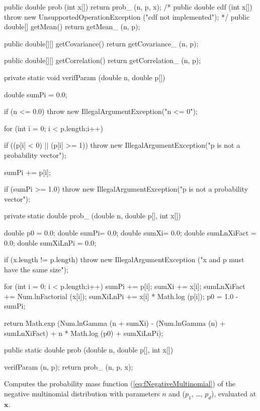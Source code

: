 \begin{code}\begin{hide}

   public double prob (int x[]) {
      return prob_ (n, p, x);
   }
/*
   public double cdf (int x[]) {
      throw new UnsupportedOperationException ("cdf not implemented");
   }
*/
   public double[] getMean() {
      return getMean_ (n, p);
   }

   public double[][] getCovariance() {
      return getCovariance_ (n, p);
   }

   public double[][] getCorrelation() {
      return getCorrelation_ (n, p);
   }

   private static void verifParam (double n, double p[]) {
      double sumPi = 0.0;

      if (n <= 0.0)
         throw new IllegalArgumentException("n <= 0");

      for (int i = 0; i < p.length;i++) {
         if ((p[i] < 0) || (p[i] >= 1))
            throw new IllegalArgumentException("p is not a probability vector");

         sumPi += p[i];
      }
      if (sumPi >= 1.0)
         throw new IllegalArgumentException("p is not a probability vector");
   }

   private static double prob_ (double n, double p[], int x[]) {
      double p0 = 0.0;
      double sumPi= 0.0;
      double sumXi= 0.0;
      double sumLnXiFact = 0.0;
      double sumXiLnPi = 0.0;

      if (x.length != p.length)
         throw new IllegalArgumentException ("x and p must have the same size");

      for (int i = 0; i < p.length;i++)
      {
         sumPi += p[i];
         sumXi += x[i];
         sumLnXiFact += Num.lnFactorial (x[i]);
         sumXiLnPi += x[i] * Math.log (p[i]);
      }
      p0 = 1.0 - sumPi;

      return Math.exp (Num.lnGamma (n + sumXi) - (Num.lnGamma (n) +
           sumLnXiFact) + n * Math.log (p0) + sumXiLnPi);
   }\end{hide}

   public static double prob (double n, double p[], int x[])\begin{hide} {
      verifParam (n, p);
      return prob_ (n, p, x);
   }\end{hide}
\end{code}
\begin{tabb}
   Computes the probability mass function (\ref{eq:fNegativeMultinomial})
   of the negative multinomial distribution with parameters
   $n$ and ($p_1$, \ldots, $p_d$), evaluated at $\mathbf{x}$.
\end{tabb}
